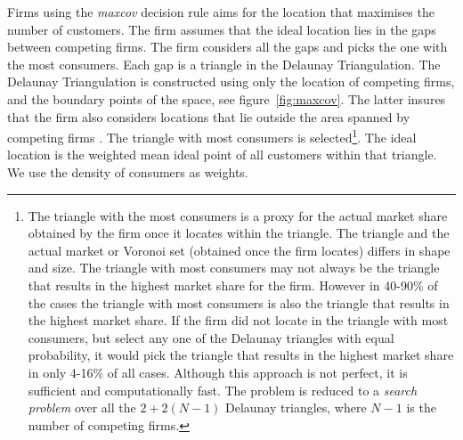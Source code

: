 \documentclass[preprint, 12pt]{elsarticle}
\begin{document}
Firms using the \emph{maxcov} decision rule aims for the location that maximises the number of customers. The firm assumes that the ideal location lies in the gaps between competing firms. The firm considers all the gaps and picks the one with the most consumers. Each gap is a triangle in the Delaunay Triangulation. The Delaunay Triangulation is constructed using only the location of competing firms, and the boundary points of the space, see figure~\ref{fig:maxcov}. The latter insures that the firm also considers locations that lie outside the area spanned by competing firms \citep[p.~556]{Cheong_Efrat_Har-Peled_2007}. The triangle with most consumers is selected\footnote{The triangle with the most consumers is a proxy for the actual market share obtained by the firm once it locates within the triangle. The triangle and the actual market or Voronoi set (obtained once the firm locates) differs in shape and size. The triangle with most consumers may not always be the triangle that results in the highest market share for the firm. However in 40-90\% of the cases the triangle with most consumers is also the triangle that results in the highest market share. If the firm did not locate in the triangle with most consumers, but select any one of the Delaunay triangles with equal probability, it would pick the triangle that results in the highest market share in only 4-16\% of all cases. Although this approach is not perfect, it is sufficient and computationally fast. The problem is reduced to a \emph{search problem} over all the $2+2(N-1)$ Delaunay triangles, where $N-1$ is the number of competing firms.}. The ideal location is the weighted mean ideal point of all customers within that triangle. We use the density of consumers as weights.
\end{document}
